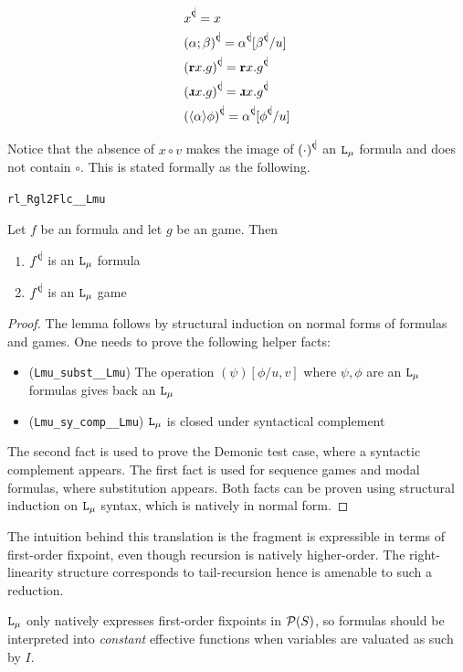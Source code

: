 \begin{align*}
   & \rlL{x} = x \\
   & \rlL{(\alpha ; \beta)} = \rlL{\alpha}[\rlL{\beta}/u] \\
   & \rlL{(\Rec x. g)} = \Rec x. \rlL{g} \\
   & \rlL{(\DRec x. g)} = \DRec x. \rlL{g} \\
   & \rlL{(\langle\alpha\rangle\phi)} = \rlL{\alpha}[\rlL{\phi}/u]
\end{align*}

Notice that the absence of $x\circ v$ makes the image of $\rlL{(\cdot)}$ an $\texttt{L}_\mu{}$ formula and does not contain $\circ$. This is stated formally as the following.

\begin{blemma}

\texttt{rl\_Rgl2Flc\_\_Lmu}

Let $f$ be an \rlGL{} formula and let $g$ be an \rlGL{} game. Then

\begin{enumerate}
    \item $\rlL{f}$ is an $\texttt{L}_\mu{}$ formula
    \item $\rlL{f}$ is an $\texttt{L}_\mu{}$ game
\end{enumerate}
    
\end{blemma}

\begin{proof}
    The lemma follows by structural induction on \rlGL{} normal forms of \rlGL{} formulas and games. One needs to prove the following helper facts:
    \begin{itemize}
        \item (\texttt{Lmu\_subst\_\_Lmu}) The operation $(\psi)[\phi/u,v]$ where $\psi, \phi$ are an $\texttt{L}_\mu{}$ formulas gives back an $\texttt{L}_\mu{}$ \\
        \item (\texttt{Lmu\_sy\_comp\_\_Lmu}) $\texttt{L}_\mu{}$ is closed under syntactical complement
    \end{itemize}
    The second fact is used to prove the Demonic test case, where a syntactic complement appears. The first fact is used for sequence games and modal formulas, where substitution appears. Both facts can be proven using structural induction on $\texttt{L}_\mu{}$ syntax, which is natively in normal form. 
\end{proof}

\begin{remark}
    The intuition behind this translation is the fragment \rlGL{} is expressible in terms of first-order fixpoint, even though recursion is natively higher-order. The right-linearity structure corresponds to tail-recursion hence is amenable to such a reduction. 
    
    $\texttt{L}_\mu{}$ only natively expresses first-order fixpoints in $\mathcal{P}(S)$, so formulas should be interpreted into \textit{constant} effective functions when variables are valuated as such by $I$.
\end{remark}

